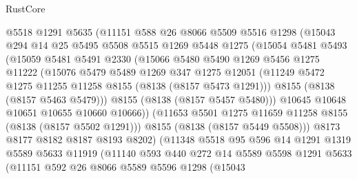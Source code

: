 \begin{lexlean}{RustCore}
\begin{coremodule}
                @5518
                @1291
                @5635
                (@11151
                  @588
                  @26
                  @8066
                  @5509
                  @5516
                  @1298
                  (@15043
                    @294
                    @14
                    @25
                    @5495
                    @5508
                    @5515
                    @1269
                    @5448
                    @1275
                    (@15054
                      @5481
                      @5493
                      (@15059
                        @5481
                        @5491
                        @2330
                        (@15066
                          @5480
                          @5490
                          @1269
                          @5456
                          @1275
                          @11222
                          (@15076
                            @5479
                            @5489
                            @1269
                            @347
                            @1275
                            @12051
                            (@11249 @5472 @1275 @11255 @11258 @8155 (@8138 (@8157 @5473 @1291)))
                            @8155
                            (@8138 (@8157 @5463 @5479)))
                          @8155
                          (@8138 (@8157 @5457 @5480)))
                        @10645
                        @10648
                        @10651
                        @10655
                        @10660
                        @10666))
                    (@11653 @5501 @1275 @11659 @11258 @8155 (@8138 (@8157 @5502 @1291)))
                    @8155
                    (@8138 (@8157 @5449 @5508)))
                  @8173
                  @8177
                  @8182
                  @8187
                  @8193
                  @8202)
                (@11348
                  @5518
                  @95
                  @596
                  @14
                  @1291
                  @1319
                  @5589
                  @5633
                  @11919
                  (@11140
                    @593
                    @440
                    @272
                    @14
                    @5589
                    @5598
                    @1291
                    @5633
                    (@11151
                      @592
                      @26
                      @8066
                      @5589
                      @5596
                      @1298
                      (@15043

\end{coremodule}
\end{lexlean}
